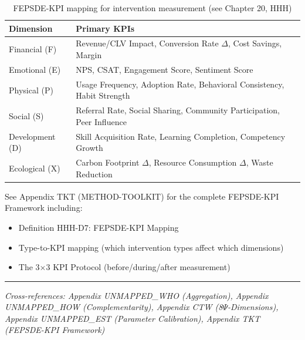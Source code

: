 \begin{table}[h]
\centering
\small
\begin{tabular}{l|p{6cm}}
\toprule
\textbf{Dimension} & \textbf{Primary KPIs} \\
\midrule
Financial (F) & Revenue/CLV Impact, Conversion Rate $\Delta$, Cost Savings, Margin \\
Emotional (E) & NPS, CSAT, Engagement Score, Sentiment Score \\
Physical (P) & Usage Frequency, Adoption Rate, Behavioral Consistency, Habit Strength \\
Social (S) & Referral Rate, Social Sharing, Community Participation, Peer Influence \\
Development (D) & Skill Acquisition Rate, Learning Completion, Competency Growth \\
Ecological (X) & Carbon Footprint $\Delta$, Resource Consumption $\Delta$, Waste Reduction \\
\bottomrule
\end{tabular}
\caption{FEPSDE-KPI mapping for intervention measurement (see Chapter 20, HHH)}
\end{table}

See Appendix TKT (METHOD-TOOLKIT) for the complete FEPSDE-KPI Framework including:
\begin{itemize}
    \item Definition HHH-D7: FEPSDE-KPI Mapping
    \item Type-to-KPI mapping (which intervention types affect which dimensions)
    \item The 3$\times$3 KPI Protocol (before/during/after measurement)
\end{itemize}

\vspace{0.5em}
\hrule
\vspace{0.5em}
\noindent\textit{Cross-references: Appendix UNMAPPED_WHO (Aggregation),
Appendix UNMAPPED_HOW (Complementarity), Appendix CTW (8$\Psi$-Dimensions),
Appendix UNMAPPED_EST (Parameter Calibration), Appendix TKT (FEPSDE-KPI Framework)}

